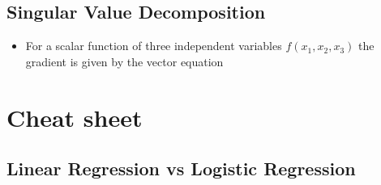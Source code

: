 \section{Singular Value Decomposition}
\begin{itemize}
    \item For a scalar function of three independent variables $f(x_{1},x_{2},x_{3})$ the gradient is given by the vector equation
\end{itemize}            




\chapter{Cheat sheet}
\section{Linear Regression vs Logistic Regression}
